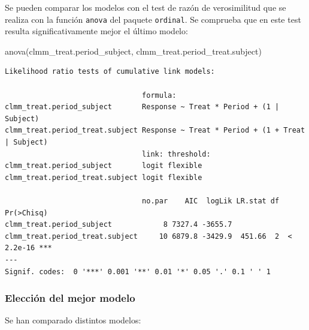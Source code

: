 \documentclass[
  12pt,
  a4paper,
  extrafontsizes,
  onecolumn,
  openright,
  table]{memoir}
\newenvironment{Shaded}{\begin{snugshade}}{\end{snugshade}}
\newcommand{\FunctionTok}[1]{\textcolor[rgb]{0.28,0.35,0.67}{#1}}
\newcommand{\NormalTok}[1]{\textcolor[rgb]{0.00,0.23,0.31}{#1}}
\begin{document}
Se pueden comparar los modelos con el test de razón de verosimilitud que
se realiza con la función \texttt{anova} del paquete \texttt{ordinal}.
Se comprueba que en este test resulta significativamente mejor el último
modelo:

\scriptsize

\begin{Shaded}
\begin{Highlighting}[]
\FunctionTok{anova}\NormalTok{(clmm\_treat.period\_subject, clmm\_treat.period\_treat.subject)}
\end{Highlighting}
\end{Shaded}

\begin{verbatim}
Likelihood ratio tests of cumulative link models:
 
                                formula:                                         
clmm_treat.period_subject       Response ~ Treat * Period + (1 | Subject)        
clmm_treat.period_treat.subject Response ~ Treat * Period + (1 + Treat | Subject)
                                link: threshold:
clmm_treat.period_subject       logit flexible  
clmm_treat.period_treat.subject logit flexible  

                                no.par    AIC  logLik LR.stat df Pr(>Chisq)    
clmm_treat.period_subject            8 7327.4 -3655.7                          
clmm_treat.period_treat.subject     10 6879.8 -3429.9  451.66  2  < 2.2e-16 ***
---
Signif. codes:  0 '***' 0.001 '**' 0.01 '*' 0.05 '.' 0.1 ' ' 1
\end{verbatim}

\normalsize

\hypertarget{elecciuxf3n-del-mejor-modelo}{%
\subsubsection{Elección del mejor
modelo}\label{elecciuxf3n-del-mejor-modelo}}

Se han comparado distintos modelos:
\end{document}
